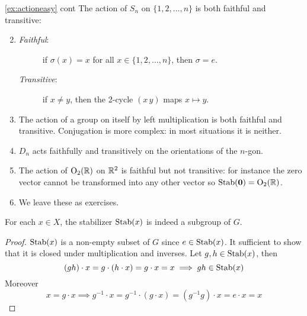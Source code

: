 \begin{examples*}{\ref{ex:actioneasy} cont}{}
	\exstart The action of $S_n$ on $\{1,2,\ldots,n\}$ is both faithful and transitive:
	\begin{enumerate}\setcounter{enumi}{1}
	  \item[]\begin{description}
	  	\item[\normalfont\emph{Faithful}:] if $\sigma(x)=x$ for all $x\in\{1,2,\ldots,n\}$, then $\sigma=e$.
	  	\item[\normalfont\emph{Transitive}:] if $x\neq y$, then the 2-cycle $(x\,y)$ maps $x\mapsto y$.
	  \end{description}
	  \item The action of a group on itself by left multiplication is both faithful and transitive. Conjugation is more complex: in most situations it is neither.
	  \item $D_n$ acts faithfully and transitively on the orientations of the $n$-gon.
	  \item The action of $\mathrm{O}_2(\mathbb{R})$ on $\mathbb{R}^2$ is faithful but not transitive: for instance the zero vector cannot be transformed into any other vector so $\operatorname{Stab}(\mathbf{0})=\mathrm{O}_2(\mathbb{R})$.
	  \item We leave these as exercises.
	\end{enumerate}
\end{examples*}


\begin{lemm}{}{}
	For each $x\in X$, the stabilizer $\operatorname{Stab}(x)$ is indeed a subgroup of $G$.
\end{lemm}

\begin{proof}
	$\operatorname{Stab}(x)$ is a non-empty subset of $G$ since $e\in \operatorname{Stab}(x)$. It sufficient to show that it is closed under multiplication and inverses. Let $g,h\in\operatorname{Stab}(x)$, then
	\[
		(gh)\cdot x=g\cdot(h\cdot x)
		=g\cdot x=x\implies gh\in\operatorname{Stab}(x)
	\]
	Moreover
	\[
		x=g\cdot x
		\implies g^{-1}\cdot x=g^{-1}\cdot (g\cdot x)
		=(g^{-1}g)\cdot x=e\cdot x=x
		\tag*{\qedhere}
	\]
\end{proof}

